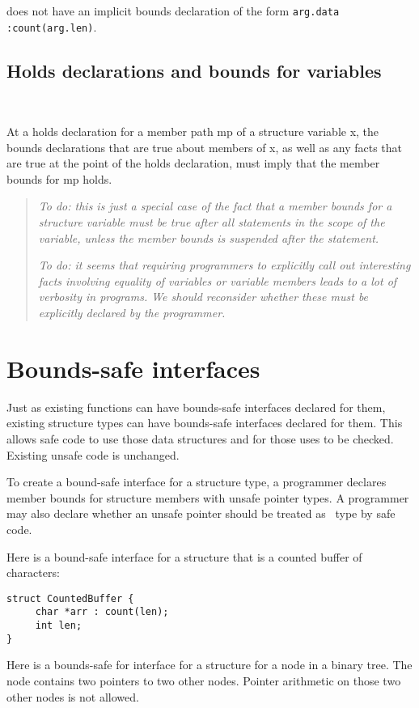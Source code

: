 does not have an implicit bounds declaration of the form \verb|arg.data :count(arg.len)|.

\subsection{Holds declarations and bounds for variables}\

At a holds declaration for a member path mp of a structure variable x,
the bounds declarations that are true about members of x, as well as any
facts that are true at the point of the holds declaration, must imply
that the member bounds for mp holds.

\begin{quote}
\emph{To do: this is just a special case of the fact that a member
bounds for a structure variable must be true after all statements in the
scope of the variable, unless the member bounds is suspended after the
statement. }

\emph{To do: it seems that requiring programmers to explicitly call out
interesting facts involving equality of variables or variable members
leads to a lot of verbosity in programs. We should reconsider whether
these must be explicitly declared by the programmer.}
\end{quote}

\section{Bounds-safe interfaces}
\label{section:structure-bounds-safe-interfaces}

Just as existing functions can have bounds-safe interfaces declared for
them, existing structure types can have bounds-safe interfaces declared
for them. This allows safe code to use those data structures and for
those uses to be checked. Existing unsafe code is unchanged.

To create a bound-safe interface for a structure type, a programmer
declares member bounds for structure members with unsafe pointer types.
A programmer may also declare whether an unsafe pointer should be
treated as \ptr\ type by safe code.

Here is a bound-safe interface for a structure that is a counted buffer
of characters:

\begin{verbatim}
struct CountedBuffer {
     char *arr : count(len);
     int len;
}
\end{verbatim}

Here is a bounds-safe for interface for a structure for a node in a
binary tree. The node contains two pointers to two other nodes. Pointer
arithmetic on those two other nodes is not allowed.

